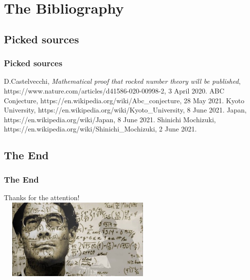\documentclass[9pt]{beamer}
\begin{document}
    \section{The Bibliography}
    
        \subsection{Picked sources}
        \begin{frame}
            \frametitle{Picked sources}
            \begin{thebibliography}{XXX}
                D.Castelvecchi, \textit{Mathematical proof that rocked number theory will be published}, https://www.nature.com/articles/d41586-020-00998-2, 3 April 2020.
                ABC Conjecture, https://en.wikipedia.org/wiki/Abc\_conjecture, 28 May 2021.
                Kyoto University, https://en.wikipedia.org/wiki/Kyoto\_University, 8 June 2021.
                Japan, https://en.wikipedia.org/wiki/Japan, 8 June 2021.
                Shinichi Mochizuki, https://en.wikipedia.org/wiki/Shinichi\_Mochizuki, 2 June 2021.
            \end{thebibliography}
        \end{frame}
        
        \subsection{The End}
        \begin{frame}
            \frametitle{The End}
            \begin{center}
                Thanks for the attention!\\\vspace{0.25cm}
                \includegraphics[width=8cm,height=4cm]{images/photo2.jpg}\\\vspace{0.25cm}
                \hyperlink{init}{}\\
            \end{center}
        \end{frame}
    
\end{document}

